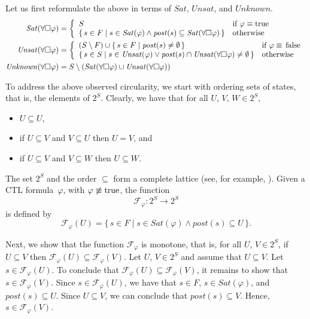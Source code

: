 \documentclass[12pt]{article}
\newcommand{\always}{\Box}
\newcommand{\TRUE}{\mbox{\lstinline{true}}}
\newcommand{\FALSE}{\mbox{\lstinline{false}}}
\theoremstyle{definition}
\begin{document}
Let us first reformulate the above in terms of $\mathit{Sat}$, $\mathit{Unsat}$, and $\mathit{Unknown}$.  
\begin{align*}
\mathit{Sat}(\forall \always \varphi) & = 
\left \{
\begin{array}{ll}
S & \mbox{if $\varphi \equiv \TRUE$}\\
\{\, s \in F \mid s \in \mathit{Sat}(\varphi) \wedge \mathit{post}(s) \subseteq \mathit{Sat}(\forall \always \varphi) \,\} & \mbox{otherwise}
\end{array}
\right .\\
\mathit{Unsat}(\forall \always \varphi) & = 
\left \{
\begin{array}{ll}
(S \setminus F) \cup \{\, s \in F \mid \mathit{post}(s) \not= \emptyset \,\} & \mbox{if $\varphi \equiv \FALSE$}\\
\{\, s \in S \mid s \in \mathit{Unsat}(\varphi) \vee \mathit{post}(s) \cap \mathit{Unsat}(\forall \always \varphi) \not= \emptyset \,\} & \mbox{otherwise}
\end{array}
\right .\\
\mathit{Unknown}(\forall \always \varphi) & = S \setminus (\mathit{Sat}(\forall \always \varphi) \cup \mathit{Unsat}(\forall \always \varphi))
\end{align*}

To address the above observed circularity, we start with ordering sets of states, that is, the elements of $2^S$.  Clearly, we have that for all $U$, $V$, $W \in 2^S$,
\begin{itemize}
\item 
$U \subseteq U$,
\item
if $U \subseteq V$ and $V \subseteq U$ then $U = V$, and
\item
if $U \subseteq V$ and $V \subseteq W$ then $U \subseteq W$.
\end{itemize}

The set $2^S$ and the order $\subseteq$ form a complete lattice (see, for example, \cite[Section~6.1]{CGP99}).  Given a CTL formula~$\varphi$, with $\varphi \not\equiv \TRUE$, the function
\[
\mathcal{F}_{\varphi} : 2^S \to 2^S
\]
is defined by
\[
\mathcal{F}_{\varphi}(U) = \{\, s \in F \mid s \in \mathit{Sat}(\varphi) \wedge \mathit{post}(s) \subseteq U \,\}.
\]

Next, we show that the function $\mathcal{F}_{\varphi}$ is monotone, that is, for all $U$, $V \in 2^S$, if $U \subseteq V$ then $\mathcal{F}_{\varphi}(U) \subseteq \mathcal{F}_{\varphi}(V)$.  Let $U$, $V \in 2^S$ and assume that $U \subseteq V$.  Let $s \in \mathcal{F}_{\varphi}(U)$. To conclude that $\mathcal{F}_{\varphi}(U) \subseteq \mathcal{F}_{\varphi}(V)$, it remains to show that $s \in \mathcal{F}_{\varphi}(V)$.  Since $s \in \mathcal{F}_{\varphi}(U)$, we have that $s \in F$, $s \in \mathit{Sat}(\varphi)$, and $\mathit{post}(s) \subseteq U$.  Since $U \subseteq V$, we can conclude that $\mathit{post}(s) \subseteq V$.  Hence, $s \in \mathcal{F}_{\varphi}(V)$.
\end{document}
